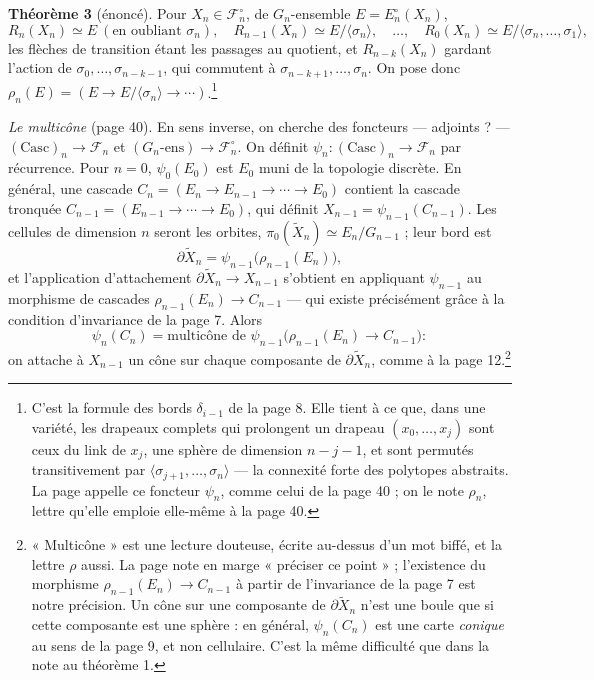 \documentclass[11pt,a4paper]{article}
\begin{document}
\textbf{Théorème 3} (énoncé). Pour $X_n \in \mathcal{F}_n^\circ$, de
$G_n$-ensemble $E = E_n^\circ(X_n)$,
\[
  R_n(X_n) \simeq E \ (\text{en oubliant } \sigma_n), \quad
  R_{n-1}(X_n) \simeq E/\langle \sigma_n \rangle, \quad \ldots, \quad
  R_0(X_n) \simeq E/\langle \sigma_n, \ldots, \sigma_1 \rangle ,
\]
les flèches de transition étant les passages au quotient, et
$R_{n-k}(X_n)$ gardant l'action de $\sigma_0, \ldots, \sigma_{n-k-1}$, qui
commutent à $\sigma_{n-k+1}, \ldots, \sigma_n$. On pose donc $\rho_n(E) = (E
\to E/\langle\sigma_n\rangle \to \cdots)$.\footnote{C'est la formule des bords
$\delta_{i-1}$ de la page 8. Elle tient à ce que, dans une variété, les
drapeaux complets qui prolongent un drapeau $(x_0, \ldots, x_j)$ sont ceux du
link de $x_j$, une sphère de dimension $n-j-1$, et sont permutés
transitivement par $\langle \sigma_{j+1}, \ldots, \sigma_n \rangle$ --- la
connexité forte des polytopes abstraits. La page appelle ce foncteur
$\psi_n$, comme celui de la page 40 ; on le note $\rho_n$, lettre qu'elle
emploie elle-même à la page 40.}

\emph{Le multicône} (page 40). En sens inverse, on cherche des foncteurs ---
adjoints ? --- $(\mathrm{Casc})_n \to \mathcal{F}_n$ et $(G_n\text{-ens}) \to
\mathcal{F}_n^\circ$. On définit $\psi_n : (\mathrm{Casc})_n \to \mathcal{F}_n$
par récurrence. Pour $n = 0$, $\psi_0(E_0)$ est $E_0$ muni de la topologie
discrète. En général, une cascade $C_n = (E_n \to E_{n-1} \to \cdots \to E_0)$
contient la cascade tronquée $C_{n-1} = (E_{n-1} \to \cdots \to E_0)$, qui
définit $X_{n-1} = \psi_{n-1}(C_{n-1})$. Les cellules de dimension $n$ seront
les orbites, $\pi_0(\widetilde{X}_n) \simeq E_n/G_{n-1}$ ; leur bord est
\[
  \partial\widetilde{X}_n = \psi_{n-1}\bigl(\rho_{n-1}(E_n)\bigr) ,
\]
et l'application d'attachement $\partial\widetilde{X}_n \to X_{n-1}$ s'obtient
en appliquant $\psi_{n-1}$ au morphisme de cascades $\rho_{n-1}(E_n) \to
C_{n-1}$ --- qui existe précisément grâce à la condition d'invariance de la
page 7. Alors
\[
  \psi_n(C_n) = \text{multicône de } \psi_{n-1}\bigl(\rho_{n-1}(E_n) \to
  C_{n-1}\bigr) :
\]
on attache à $X_{n-1}$ un cône sur chaque composante de
$\partial\widetilde{X}_n$, comme à la page 12.\footnote{« Multicône » est une
lecture douteuse, écrite au-dessus d'un mot biffé, et la lettre $\rho$ aussi.
La page note en marge « préciser ce point » ; l'existence du morphisme
$\rho_{n-1}(E_n) \to C_{n-1}$ à partir de l'invariance de la page 7 est
notre précision. Un cône sur une composante de $\partial\widetilde{X}_n$
n'est une boule que si cette composante est une sphère : en général,
$\psi_n(C_n)$ est une carte \emph{conique} au sens de la page 9, et non
cellulaire. C'est la même difficulté que dans la note au théorème 1.}
\end{document}
